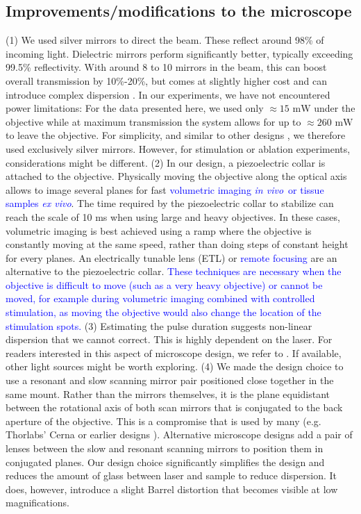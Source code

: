 \documentclass[10pt,letterpaper]{article}
\newcommand{\invivo}{\textit{in vivo}~}
\begin{document}
\subsection*{Improvements/modifications to the microscope}
(1) We used silver mirrors to direct the beam. These reflect around 98\% of incoming light. Dielectric mirrors perform significantly better, typically exceeding 99.5\% reflectivity. With around 8 to 10 mirrors in the beam, this can boost overall transmission by 10\%-20\%, but comes at slightly higher cost and can introduce complex dispersion \cite{Rupprecht2019}. In our experiments, we have not encountered power limitations: For the data presented here, we used only $\approx 15\text{ mW}$ under the objective while at maximum transmission the system allows for up to $\approx 260\text{ mW}$ to leave the objective. For simplicity, and similar to other designs \cite{Sofroniew2016}, we therefore used exclusively silver mirrors. However, for stimulation or ablation experiments, considerations might be different.\newline
(2) In our design, a piezoelectric collar is attached to the objective. Physically moving the objective along the optical axis allows to image several planes for fast \textcolor{blue}{volumetric imaging \invivo or tissue samples \textit{ex vivo}}. The time required by the piezoelectric collar to stabilize can reach the scale of 10 ms when using large and heavy objectives. In these cases, volumetric imaging is best achieved using a ramp where the objective is constantly moving at the same speed, rather than doing steps of constant height for every planes. An electrically tunable lens (ETL) \cite{Chen2016} or \textcolor{blue}{remote focusing} \cite{Botcherby2007} are an alternative to the piezoelectric collar. \textcolor{blue}{These techniques are necessary when the objective is difficult to move (such as a very heavy objective) or cannot be moved, for example during volumetric imaging combined with controlled stimulation, as moving the objective would also change the location of the stimulation spots.}\newline
(3) Estimating the pulse duration suggests non-linear dispersion that we cannot correct. This is highly dependent on the laser. For readers interested in this aspect of microscope design, we refer to \cite{Saidi2023, Bueno2019}. If available, other light sources might be worth exploring.\newline
(4) We made the design choice to use a resonant and slow scanning mirror pair positioned close together in the same mount. Rather than the mirrors themselves, it is the plane equidistant between the rotational axis of both scan mirrors that is conjugated to the back aperture of the objective. This is a compromise that is used by many (e.g. Thorlabs' Cerna or earlier designs \cite{Rosenegger2014, Tan1999, Nguyen2001}). Alternative microscope designs add a pair of lenses between the slow and resonant scanning mirrors to position them in conjugated planes. Our design choice significantly simplifies the design and reduces the amount of glass between laser and sample to reduce dispersion. It does, however, introduce a slight Barrel distortion that becomes visible at low magnifications.\newline
\end{document}
